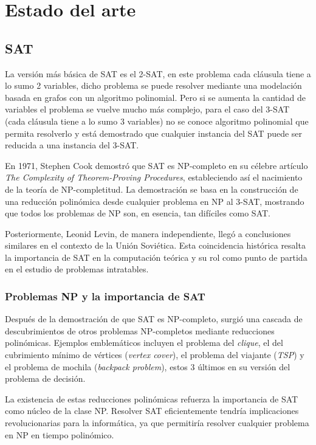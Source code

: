 \chapter{Estado del arte}

\section{SAT}

La versión más básica de SAT es el 2-SAT, en este problema cada cláusula tiene a lo sumo 2 variables, dicho problema se puede
resolver mediante una modelación basada en grafos con un algoritmo polinomial. Pero si se aumenta la cantidad de variables
el problema se vuelve mucho más complejo, para el caso del 3-SAT (cada cláusula tiene a lo sumo 3 variables) no se conoce algoritmo
polinomial que permita resolverlo y está demostrado que cualquier instancia del SAT puede ser reducida a una instancia del 3-SAT.

En 1971, Stephen Cook demostró que SAT es NP-completo en su célebre artículo \textit{The Complexity of Theorem-Proving Procedures},
estableciendo así el nacimiento de la teoría de NP-completitud. La demostración se basa en la construcción de una
reducción polinómica desde cualquier problema en NP al 3-SAT, mostrando que todos los problemas de NP son, en esencia,
tan difíciles como SAT.

Posteriormente, Leonid Levin, de manera independiente, llegó a conclusiones similares en el contexto de la
Unión Soviética. Esta coincidencia histórica resalta la importancia de SAT en la computación teórica y su rol como
punto de partida en el estudio de problemas intratables.

\subsection{Problemas NP y la importancia de SAT}

Después de la demostración de que SAT es NP-completo, surgió una cascada de descubrimientos de otros problemas
NP-completos mediante reducciones polinómicas. Ejemplos emblemáticos incluyen el problema del \textit{clique},
el del cubrimiento mínimo de vértices (\textit{vertex cover}), el problema del viajante (\textit{TSP}) y el problema de mochila (\textit{backpack problem}),
estos 3 últimos en su versión del problema de decisión.

La existencia de estas reducciones polinómicas refuerza la importancia de SAT como núcleo de la clase NP.
Resolver SAT eficientemente tendría implicaciones revolucionarias para la informática, ya que permitiría resolver
cualquier problema en NP en tiempo polinómico.

